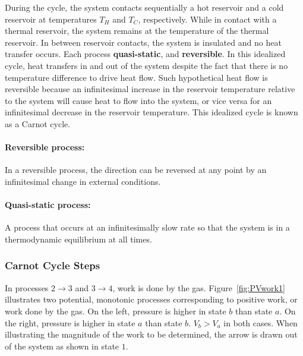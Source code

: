 During the cycle, the system contacts sequentially a hot reservoir and a cold reservoir at temperatures $T_H$ and $T_C$, respectively. While in contact with a thermal reservoir, the system remains at the temperature of the thermal reservoir. In between reservoir contacts, the system is insulated and no heat transfer occurs. Each process \textbf{quasi-static}, and \textbf{reversible}. In this idealized cycle, heat transfers in and out of the system despite the fact that there is no temperature difference to drive heat flow. Such hypothetical heat flow is reversible because an infinitesimal increase in the reservoir temperature relative to the system will cause heat to flow into the system, or vice versa for an infinitesimal decrease in the reservoir temperature. This idealized cycle is known as a Carnot cycle. 

\paragraph{Reversible process:} In a reversible process, the direction can be reversed at any point by an infinitesimal change in external conditions. 

\paragraph{Quasi-static process:} A process that occurs at an infinitesimally slow rate so that the system is in a thermodynamic equilibrium at all times.

\subsubsection{Carnot Cycle Steps}

In processes $2 \to 3$ and $3 \to 4$, work is done by the gas. Figure~\ref{fig:PVwork1} illustrates two potential, monotonic processes corresponding to positive work, or work done by the gas. On the left, pressure is higher in state $b$ than state $a$. On the right, pressure is higher in state $a$ than state $b$. $V_b > V_a$ in both cases. When illustrating the magnitude of the work to be determined, the arrow is drawn out of the system as shown in state $1$. 



